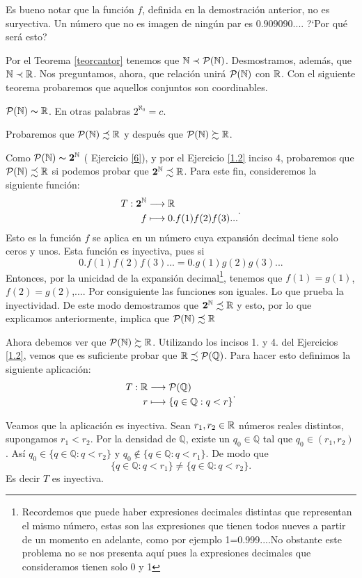 Es bueno notar que la función $f$, definida en la demostración
anterior, no es suryectiva. Un número que no es imagen de
ningún par es $0.909090...$. ?`Por qué será esto?

Por el Teorema \vref{teorcantor} tenemos que
$\mathbb{N}\prec\mathcal{P}(\mathbb{N})$. Desmostramos, además, que $\mathbb{N}\prec
\mathbb{R}$. Nos preguntamos, ahora, que relación unirá
$\mathcal{P}(\mathbb{N})$ con $\mathbb{R}$. Con el siguiente teorema probaremos
que aquellos conjuntos son coordinables.

\begin{teorema} $\mathcal{P}(\mathbb{N})\thicksim\mathbb{R}$. En otras palabras $2^{\aleph_0}=c$.
\end{teorema}
\begin{demo} Probaremos que $\mathcal{P}(\mathbb{N})\precsim\mathbb{R}$ y después que
$\mathcal{P}(\mathbb{N})\succsim\mathbb{R}$.

 Como $\mathcal{P}(\mathbb{N})\thicksim\mathbf{2}^{\mathbb{N}}$ ( Ejercicio \vref{6}), y por el
 Ejercicio \vref{1.2} inciso 4, probaremos que $\mathcal{P}(\mathbb{N})\precsim\mathbb{R}$ si podemos
 probar que $\mathbf{2}^{\mathbb{N}}\precsim \mathbb{R}$. Para este fin,
 consideremos la siguiente función:
 \[
    \begin{split}
          T:\mathbf{2}^{\mathbb{N}}&\longrightarrow \mathbb{R}\\
           f&\longmapsto 0.f(1)f(2)f(3)...\\
    \end{split}
 .\]
Esto es la función $f$ se aplica en un número cuya expansión
decimal tiene solo ceros y unos. Esta función es inyectiva, pues
si
\[0.f(1)f(2)f(3)...=0.g(1)g(2)g(3)...\]
Entonces, por la unicidad de la expansión
decimal\footnote{Recordemos que puede haber expresiones decimales
distintas que representan el mismo número, estas son las
expresiones que tienen todos nueves a partir de un momento en
adelante, como por ejemplo 1=0.999....No obstante este problema no
se nos presenta aquí pues la expresiones decimales que
consideramos tienen solo 0 y 1}, tenemos que $f(1)=g (1)$,
$f(2)=g(2)$,.... Por consiguiente las funciones son iguales. Lo
que prueba la inyectividad. De este modo demostramos que
$\mathbf{2}^{\mathbb{N}}\precsim \mathbb{R}$ y esto, por lo que explicamos
anteriormente, implica que $\mathcal{P}(\mathbb{N})\precsim \mathbb{R}$

Ahora debemos ver que $\mathcal{P}(\mathbb{N})\succsim\mathbb{R}$. Utilizando
los  incisos 1. y 4. del Ejercicios \vref{1.2}, vemos que es
suficiente probar que $\mathbb{R}\precsim \mathcal{P}(\mathbb{Q})$. Para
hacer esto definimos la siguiente aplicación:
\[
   \begin{split}
        T:\mathbb{R} &\longrightarrow \mathcal{P}(\mathbb{Q})\\
        r &\longmapsto \{q\in\mathbb{Q}:q<r\}
   \end{split}
.\]

Veamos que  la aplicación es inyectiva. Sean $r_1,r_2\in\mathbb{R}$
números reales distintos, supongamos $r_1<r_2$. Por la densidad
de $\mathbb{Q}$, existe un $q_0\in\mathbb{Q}$ tal que
$q_0\in(r_1,r_2)$. Así $q_0\in\{q\in\mathbb{Q}:q<r_2\}$ y
$q_0\notin\{q\in\mathbb{Q}:q<r_1\}$. De modo que
\[\{q\in\mathbb{Q}:q<r_1\}\neq\{q\in\mathbb{Q}:q<r_2\}.\]
Es decir $T$ es inyectiva.
\end{demo}
